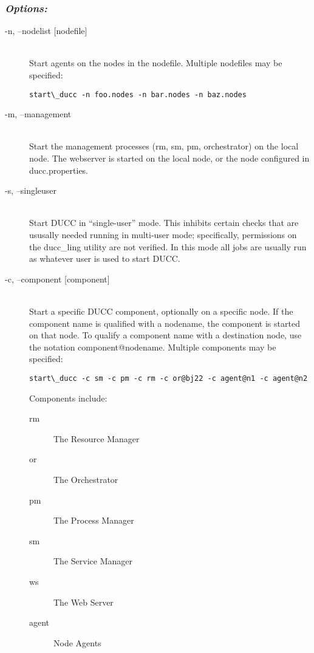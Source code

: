       \subsubsection{{\em Options: }}
      \begin{description}

        \item[-n, --nodelist {[nodefile] }] \hfill \\
          Start agents on the nodes in the nodefile. Multiple nodefiles may be specified: 
\begin{verbatim}
start\_ducc -n foo.nodes -n bar.nodes -n baz.nodes 
\end{verbatim}
          

        \item[-m, --management] \hfill \\
          Start the management processes (rm, sm, pm, orchestrator) on the local node. The 
          webserver is started on the local node, or the node configured in ducc.properties. 

        \item[-s, --singleuser] \hfill \\
          Start DUCC in ``single-user'' mode.  This inhibits certain checks that are ususally
          needed running in multi-user mode; specifically, permissions on the ducc\_ling
          utility are not verified.  In this mode all jobs are usually run as whatever user is used
          to start DUCC.

        \item[-c, --component {[component] }] \hfill \\
          Start a specific DUCC component, optionally on a specific node. If the component 
          name is qualified with a nodename, the component is started on that node. To qualify 
          a component name with a destination node, use the notation component@nodename. 
          Multiple components may be specified: 
\begin{verbatim}
start\_ducc -c sm -c pm -c rm -c or@bj22 -c agent@n1 -c agent@n2 
\end{verbatim}
          
          Components include: 
          \begin{description}
            \item[rm] The Resource Manager
            \item[or]The Orchestrator
            \item[pm]The Process Manager
            \item[sm]The Service Manager
            \item[ws]The Web Server
            \item[agent]Node Agents
          \end{description}

      \end{description}

